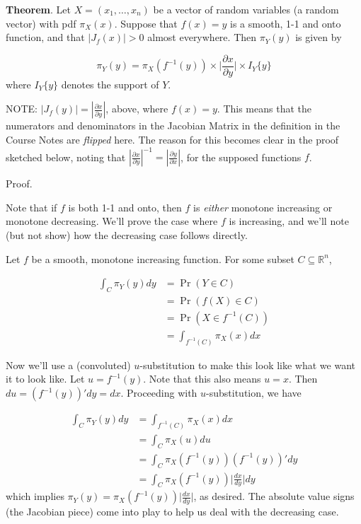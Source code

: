 \documentclass[
  letterpaper,
  DIV=11,
  numbers=noendperiod]{scrreprt}
\begin{document}
\textbf{Theorem}. Let \(X = (x_1, \dots, x_n)\) be a vector of random
variables (a random vector) with pdf \(\pi_{X}(x)\). Suppose that
\(f(x) = y\) is a smooth, 1-1 and onto function, and that
\(|J_f(x)| > 0\) almost everywhere. Then \(\pi_Y(y)\) is given by

\[
\pi_Y(y) = \pi_{X}(f^{-1}(y)) \times \bigg| \frac{\partial x}{\partial y} \bigg| \times I_Y\{y\}
\] where \(I_Y \{y \}\) denotes the support of \(Y\).

NOTE: \(| J_f(y) | = | \frac{\partial x}{\partial y} |\), above, where
\(f(x) = y\). This means that the numerators and denominators in the
Jacobian Matrix in the definition in the Course Notes are \emph{flipped}
here. The reason for this becomes clear in the proof sketched below,
noting that
\(| \frac{\partial x}{\partial y} |^{-1} = | \frac{\partial y}{\partial x} |\),
for the supposed functions \(f\).

Proof.

Note that if \(f\) is both 1-1 and onto, then \(f\) is \emph{either}
monotone increasing or monotone decreasing. We'll prove the case where
\(f\) is increasing, and we'll note (but not show) how the decreasing
case follows directly.

Let \(f\) be a smooth, monotone increasing function. For some subset
\(C \subseteq \mathbb{R}^n\),

\begin{align*}
\int_C \pi_Y(y) dy & = \Pr(Y \in C) \\
& = \Pr(f(X) \in C) \\
& = \Pr(X \in f^{-1}(C)) \\
& = \int_{f^{-1}(C)} \pi_X(x) dx 
\end{align*}

Now we'll use a (convoluted) \(u\)-substitution to make this look like
what we want it to look like. Let \(u = f^{-1}(y)\). Note that this also
means \(u = x\). Then \(du = (f^{-1}(y))' dy = dx\). Proceeding with
\(u\)-substitution, we have

\begin{align*}
\int_C \pi_Y(y) dy & = \int_{f^{-1}(C)} \pi_X(x) dx \\
& = \int_C \pi_X(u) du \\
& = \int_C \pi_X(f^{-1}(y)) (f^{-1}(y))' dy \\
& = \int_C \pi_X(f^{-1}(y)) 
\bigg| \frac{dx}{dy} \bigg| dy 
\end{align*} which implies \(\pi_Y(y) = \pi_X(f^{-1}(y))
\bigg| \frac{dx}{dy} \bigg|\), as desired. The absolute value signs (the
Jacobian piece) come into play to help us deal with the decreasing case.
\end{document}
